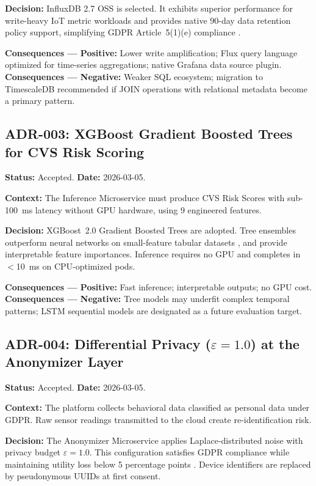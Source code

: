 \documentclass[conference]{IEEEtran}
\begin{document}
\textbf{Decision:} InfluxDB 2.7 OSS is selected. It exhibits superior performance
for write-heavy IoT metric workloads and provides native 90-day data retention policy
support, simplifying GDPR Article~5(1)(e) compliance \cite{b7}.

\textbf{Consequences — Positive:} Lower write amplification; Flux query language
optimized for time-series aggregations; native Grafana data source plugin.
\textbf{Consequences — Negative:} Weaker SQL ecosystem; migration to TimescaleDB
recommended if JOIN operations with relational metadata become a primary pattern.

\subsection{ADR-003: XGBoost Gradient Boosted Trees for CVS Risk Scoring}

\textbf{Status:} Accepted. \quad \textbf{Date:} 2026-03-05.

\textbf{Context:} The Inference Microservice must produce CVS Risk Scores with
sub-100~ms latency without GPU hardware, using 9 engineered features.

\textbf{Decision:} XGBoost~2.0 Gradient Boosted Trees are adopted. Tree ensembles
outperform neural networks on small-feature tabular datasets \cite{b19}, and provide
interpretable feature importances. Inference requires no GPU and completes in
$<$10~ms on CPU-optimized pods.

\textbf{Consequences — Positive:} Fast inference; interpretable outputs; no GPU cost.
\textbf{Consequences — Negative:} Tree models may underfit complex temporal patterns;
LSTM sequential models are designated as a future evaluation target.

\subsection{ADR-004: Differential Privacy ($\varepsilon = 1.0$) at the Anonymizer Layer}

\textbf{Status:} Accepted. \quad \textbf{Date:} 2026-03-05.

\textbf{Context:} The platform collects behavioral data classified as personal data
under GDPR. Raw sensor readings transmitted to the cloud create re-identification risk.

\textbf{Decision:} The Anonymizer Microservice applies Laplace-distributed noise with
privacy budget $\varepsilon = 1.0$. This configuration satisfies GDPR compliance while
maintaining utility loss below 5 percentage points \cite{b11,b23}. Device identifiers
are replaced by pseudonymous UUIDs at first consent.
\end{document}
